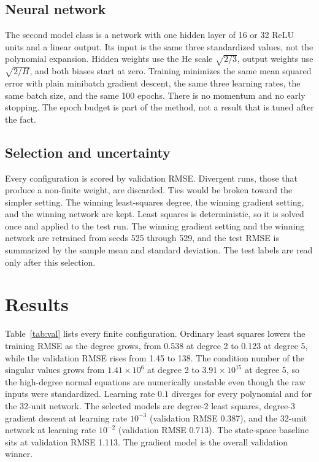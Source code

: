 \documentclass[conference]{IEEEtran}
\begin{document}
\subsection{Neural network}
The second model class is a network with one hidden layer of 16 or 32 ReLU units and a linear output. Its input is the same three standardized values, not the polynomial expansion. Hidden weights use the He scale $\sqrt{2/3}$, output weights use $\sqrt{2/H}$, and both biases start at zero. Training minimizes the same mean squared error with plain minibatch gradient descent, the same three learning rates, the same batch size, and the same 100 epochs. There is no momentum and no early stopping. The epoch budget is part of the method, not a result that is tuned after the fact.

\subsection{Selection and uncertainty}
Every configuration is scored by validation RMSE. Divergent runs, those that produce a non-finite weight, are discarded. Ties would be broken toward the simpler setting. The winning least-squares degree, the winning gradient setting, and the winning network are kept. Least squares is deterministic, so it is solved once and applied to the test run. The winning gradient setting and the winning network are retrained from seeds 525 through 529, and the test RMSE is summarized by the sample mean and standard deviation. The test labels are read only after this selection.

\section{Results}
Table~\ref{tab:val} lists every finite configuration. Ordinary least squares lowers the training RMSE as the degree grows, from 0.538 at degree 2 to 0.123 at degree 5, while the validation RMSE rises from 1.45 to 138. The condition number of the singular values grows from $1.41 \times 10^{6}$ at degree 2 to $3.91 \times 10^{15}$ at degree 5, so the high-degree normal equations are numerically unstable even though the raw inputs were standardized. Learning rate $0.1$ diverges for every polynomial and for the 32-unit network. The selected models are degree-2 least squares, degree-3 gradient descent at learning rate $10^{-3}$ (validation RMSE 0.387), and the 32-unit network at learning rate $10^{-2}$ (validation RMSE 0.713). The state-space baseline sits at validation RMSE 1.113. The gradient model is the overall validation winner.
\end{document}
